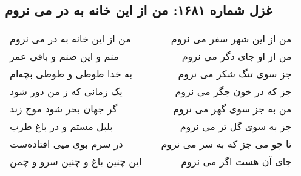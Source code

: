 \begin{center}
\section*{غزل شماره ۱۶۸۱: من از این خانه به در می نروم}
\label{sec:1681}
\begin{longtable}{l p{0.5cm} r}
من از این خانه به در می نروم
&&
من از این شهر سفر می نروم
\\
منم و این صنم و باقی عمر
&&
من از او جای دگر می نروم
\\
به خدا طوطی و طوطی بچه‌ام
&&
جز سوی تنگ شکر می نروم
\\
یک زمانی که ز من دور شود
&&
جز که در خون جگر می نروم
\\
گر جهان بحر شود موج زند
&&
من به جز سوی گهر می نروم
\\
بلبل مستم و در باغ طرب
&&
جز به سوی گل تر می نروم
\\
در سرم بوی میی افتاده‌ست
&&
تا چو می جز که به سر می نروم
\\
این چنین باغ و چنین سرو و چمن
&&
جای آن هست اگر می نروم
\\
\end{longtable}
\end{center}
